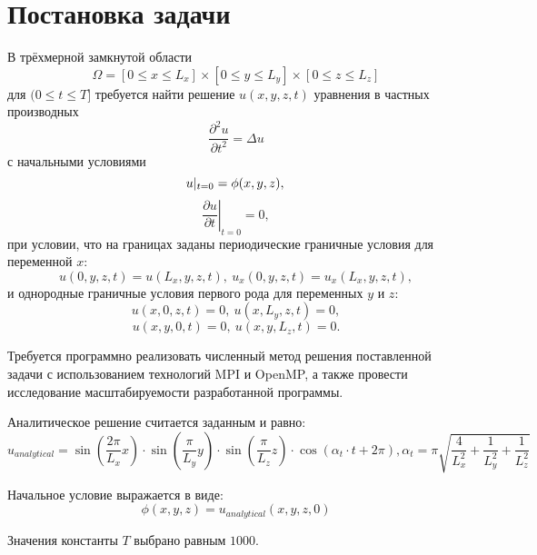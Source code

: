 \section{Постановка задачи}
\label{sec:Statement} 

В трёхмерной замкнутой области
$$
\Omega = [ 0 \leqslant x \leqslant L_x ] \times [ 0 \leqslant y \leqslant L_y ] \times [ 0 \leqslant z \leqslant L_z ]
$$
для $(0 \le t \leqslant T]$ требуется найти решение $u(x,y,z,t)$ уравнения в частных производных 
\begin{equation}
\frac{\partial^2 u}{\partial t^2} = \Delta u
\label{eq:gen}
\end{equation}
с начальными условиями
$$
u |_{t=0} = \phi(x,y,z), \\
$$
$$
\left. \frac{\partial u}{\partial t} \right |_{t=0} = 0,
$$
при условии, что на границах заданы периодические граничные условия для переменной $x$:
$$
u(0,y,z,t) = u(L_x,y,z,t),\ u_x(0,y,z,t) = u_x(L_x,y,z,t),
$$
и однородные граничные условия первого рода для переменных $y$ и $z$:
$$
u(x,0,z,t) = 0,\ u(x,L_y,z,t) = 0,
$$
$$
u(x,y,0,t) = 0,\ u(x,y,L_z,t) = 0.
$$

Требуется программно реализовать численный метод решения поставленной задачи с использованием технологий MPI и OpenMP, а также провести исследование масштабируемости разработанной программы.

Аналитическое решение считается заданным и равно:
$$
u_{analytical} = \sin(\frac{2\pi}{L_x} x) \cdot \sin(\frac{\pi}{L_y} y) \cdot \sin(\frac{\pi}{L_z} z) \cdot \cos(\alpha_t \cdot t + 2\pi), \alpha_t = \pi \sqrt{\frac{4}{L_x^2} + \frac{1}{L_y^2} + \frac{1}{L_z^2}}
$$

Начальное условие выражается в виде:
$$
\phi(x,y,z) = u_{analytical}(x,y,z,0)
$$

Значения константы $T$ выбрано равным $1000$.